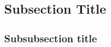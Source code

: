 \documentclass{ttuthes2015}
\begin{document}
\subsection{Subsection Title} %

\subsubsection{Subsubsection title}

\backmatter



\singlespacing







\end{document}
